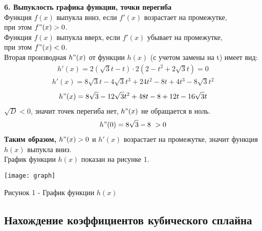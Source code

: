 \documentclass[russian,utf8,nocolumnxxxi,nocolumnxxxii]{eskdtext}
\begin{document}
      \textbf{6. Выпуклость графика функции, точки перегиба}\\
     Функция ${f(x)}$ выпукла вниз, если ${f'(x)}$ возрастает на промежутке, \\
     при этом  ${f"(x)}>0$.\\
      Функция ${f(x)}$ выпукла вверх, если ${f'(x)}$ убывает на промежутке, \\
      при этом  ${f"(x)}<0$.\\[10pt]
     Вторая производная ${h"(x)}$ от функции ${h(x)}$ (с учетом замены на {t}) имеет вид:\\
     \begin{equation}\label{eq:num24}
     \begin{align}
     h'(x)=2(\sqrt{3}t-t)\cdot2(2-t^2+2\sqrt{3}t)=0
     \end{align}
     \end{equation}
      \begin{equation}\label{eq:num25}
      \begin{align}
      h'(x)=8\sqrt{3}t-4\sqrt{3}t^3+24t^2-8t+4t^3-8\sqrt{3}t^2
      \end{align}
      \end{equation}
       \begin{equation}\label{eq:num26}
       \begin{align}
       h"(x)=8\sqrt{3}-12\sqrt{3}t^2+48t-8+12t-16\sqrt{3}t
       \end{align}
       \end{equation}
       $\sqrt{D}<0$, значит точек перегиба нет, $h"(x)$ не обращается в ноль.
       \begin{equation}\label{eq:num27}
       \begin{align}
       h"(0)=8\sqrt{3}-8\,\,>0
       \end{align}
       \end{equation}
       \textbf{Таким образом,} $h"(x)>0$ и ${h'(x)}$ возрастает на промежутке, значит
       функция ${h(x)}$ выпукла вниз.\\
       График функции ${h(x)}$ показан на рисунке 1. \\
       \begin{center}
       	\texttt{[image: graph]}
       \end{center}
       \begin{center}
       	Рисунок 1 - График функции ${h(x)}$
       \end{center}
      \newpage
      \subsection{Нахождение коэффициентов кубического сплайна}
     \upshape
\end{document}

